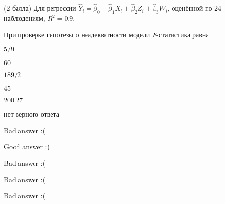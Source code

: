 
\begin{question}
(2 балла) Для регрессии
\(\hat Y_i = \hat\beta_0 + \hat\beta_1 X_i + \hat\beta_2 Z_i + \hat\beta_3 W_i\),
оценённой по 24 наблюдениям, \(R^2=0.9\).

При проверке гипотезы о неадекватности модели \(F\)-статистика равна
\begin{answerlist}
  \item \(5/9\)
  \item \(60\)
  \item \(189/2\)
  \item \(45\)
  \item \(200.27\)
  \item нет верного ответа
\end{answerlist}
\end{question}

\begin{solution}
\begin{answerlist}
  \item Bad answer :(
  \item Good answer :)
  \item Bad answer :(
  \item Bad answer :(
  \item Bad answer :(
\end{answerlist}
\end{solution}
